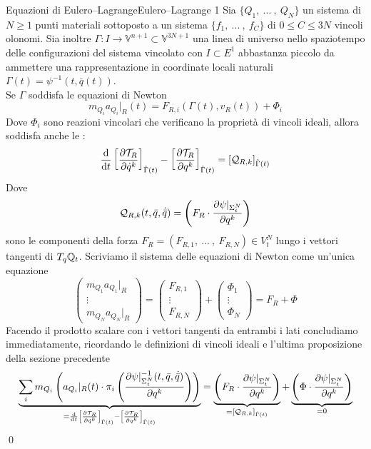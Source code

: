 \documentclass[openany]{book}
\renewcommand\V{\mathbb{V}}
\begin{document}
\begin{theorem}{Equazioni di Eulero--Lagrange}{Eulero--Lagrange 1}
    Sia $\{Q_1,\ ...\ ,\ Q_N\}$ un sistema di $N\ge 1$ punti materiali sottoposto a un sistema $\{f_1,\ ...\ ,\ f_C\}$ di $0\le C\le 3N$ vincoli olonomi. Sia inoltre $\Gamma:I\to\V^{n+1}\subset\V^{3N+1}$ una linea di universo nello spaziotempo delle configurazioni del sistema vincolato con $I\subset E^1$ abbastanza piccolo da ammettere una rappresentazione in coordinate locali naturali $\Gamma(t) = \psi^{-1}(t,\bar q(t))$.\\
    Se $\Gamma$ soddisfa le equazioni di Newton 
    \[ m_{Q_i}a_{Q_i}|_R(t) = F_{R,i}(\Gamma(t),v_R(t)) + \Phi_i \]
    Dove $\Phi_i$ sono reazioni vincolari che verificano la proprietà di vincoli ideali, allora soddisfa anche le :
    \[ \frac{\text{d}}{\text{d} t}\left[ \frac{\partial \mathcal{T}_R}{\partial \dot q^k} \right]_{\hat\Gamma(t)} - \left[ \frac{\partial\mathcal{T}_R}{\partial q^k} \right]_{\hat\Gamma(t)} = [\mathcal{Q}_{R,k}]_{\hat\Gamma(t)} \]
    Dove 
    \[ \mathcal{Q}_{R,k}(t,\bar q, \dot{\bar q}) = \left( F_R \cdot \frac{ \partial \psi|_{\Sigma_t^N}}{\partial q^k} \right) \]
    sono le componenti della forza $F_R = (F_{R,1},\ ...\ ,\ F_{R,N}) \in V_t^N$ lungo i vettori tangenti di $T_q\mathbb{Q}_t$.
    \proof 
    Scriviamo il sistema delle equazioni di Newton come un'unica equazione 
    \[ \begin{pmatrix}
        m_{Q_1}a_{Q_1}|_R \\ \vdots \\ m_{Q_N}a_{Q_N}|_R
    \end{pmatrix} = \begin{pmatrix}
        F_{R,1} \\ \vdots \\ F_{R,N}
    \end{pmatrix} + \begin{pmatrix}
        \Phi_1 \\ \vdots \\ \Phi_N
    \end{pmatrix} = F_R + \Phi \]
    Facendo il prodotto scalare con i vettori tangenti da entrambi i lati concludiamo immediatamente, ricordando le definizioni di vincoli ideali e l'ultima proposizione della sezione precedente
    \[ \underbrace{ \sum_i m_{Q_i} \left( a_{Q_i}|_R(t)\cdot \pi_i\left( \frac{\partial \psi|_{\Sigma_t^N}^{-1}(t,\bar q,\dot{\bar q})}{\partial q^k} \right) \right) }_{ = \frac{\text{d}}{\text{d} t}\left[ \frac{\partial \mathcal{T}_R}{\partial \dot q^k} \right]_{\hat\Gamma(t)} - \left[ \frac{\partial\mathcal{T}_R}{\partial q^k} \right]_{\hat\Gamma(t)} } = \underbrace{ \left( F_R \cdot \frac{ \partial \psi|_{\Sigma_t^N}}{\partial q^k} \right) }_{= [\mathcal{Q}_{R,k}]_{\hat\Gamma(t)}} + \underbrace{ \left( \Phi \cdot \frac{ \partial \psi|_{\Sigma_t^N}}{\partial q^k} \right)}_{= 0}  \]
    \qed 
\end{theorem}
\end{document}
